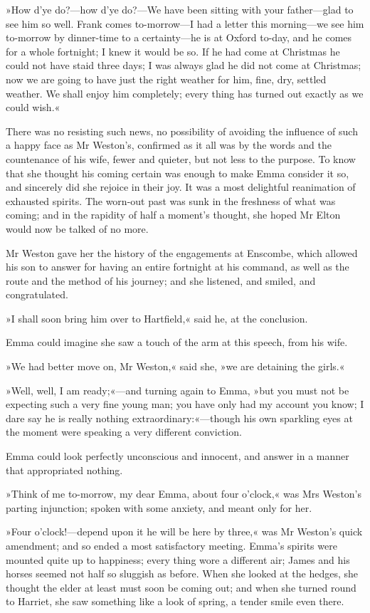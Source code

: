 »How d'ye do?—how d'ye do?—We have been sitting with your father—glad to see him so well. Frank comes to-morrow—I had a letter this morning—we see him to-morrow by dinner-time to a certainty—he is at Oxford to-day, and he comes for a whole fortnight; I knew it would be so. If he had come at Christmas he could not have staid three days; I was always glad he did not come at Christmas; now we are going to have just the right weather for him, fine, dry, settled weather. We shall enjoy him completely; every thing has turned out exactly as we could wish.«

There was no resisting such news, no possibility of avoiding the influence of such a happy face as Mr Weston's, confirmed as it all was by the words and the countenance of his wife, fewer and quieter, but not less to the purpose. To know that she thought his coming certain was enough to make Emma consider it so, and sincerely did she rejoice in their joy. It was a most delightful reanimation of exhausted spirits. The worn-out past was sunk in the freshness of what was coming; and in the rapidity of half a moment's thought, she hoped Mr Elton would now be talked of no more.

Mr Weston gave her the history of the engagements at Enscombe, which allowed his son to answer for having an entire fortnight at his command, as well as the route and the method of his journey; and she listened, and smiled, and congratulated.

»I shall soon bring him over to Hartfield,« said he, at the conclusion.

Emma could imagine she saw a touch of the arm at this speech, from his wife.

»We had better move on, Mr Weston,« said she, »we are detaining the girls.«

»Well, well, I am ready;«—and turning again to Emma, »but you must not be expecting such a very fine young man; you have only had my account you know; I dare say he is really nothing extraordinary:«—though his own sparkling eyes at the moment were speaking a very different conviction.

Emma could look perfectly unconscious and innocent, and answer in a manner that appropriated nothing.

»Think of me to-morrow, my dear Emma, about four o'clock,« was Mrs Weston's parting injunction; spoken with some anxiety, and meant only for her.

»Four o'clock!—depend upon it he will be here by three,« was Mr Weston's quick amendment; and so ended a most satisfactory meeting. Emma's spirits were mounted quite up to happiness; every thing wore a different air; James and his horses seemed not half so sluggish as before. When she looked at the hedges, she thought the elder at least must soon be coming out; and when she turned round to Harriet, she saw something like a look of spring, a tender smile even there.


